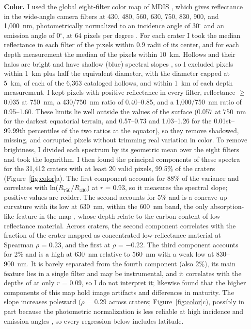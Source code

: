 \documentclass{planetary}
\begin{document}
\textbf{Color.} \label{sec:colorS} I used the global eight-filter color map of MDIS \parencite{mdis_mdr,murchie2015}, which gives reflectance in the wide-angle camera filters at 430, 480, 560, 630, 750, 830, 900, and 1,000~nm, photometrically normalized to an incidence angle of 30$^\circ$ and an emission angle of 0$^\circ$, at 64 pixels per degree \parencite{denevi2018}. For each crater I took the median reflectance in each filter of the pixels within 0.9 radii of its center, and for each depth measurement the median of the pixels within 10~km. Hollows and their halos are bright and have shallow (blue) spectral slopes \parencite{blewettMultispectralImagesMercury2009}, so I excluded pixels within 1~km plus half the equivalent diameter, with the diameter capped at 5~km, of each of the 6,363 cataloged hollows, and within 1~km of each depth measurement. I kept pixels with positive reflectance in every filter, reflectance $\geq$ 0.035 at 750~nm, a 430/750~nm ratio of 0.40--0.85, and a 1,000/750~nm ratio of 0.95--1.60. These limits lie well outside the values of the surface (0.057 at 750~nm for the darkest equatorial terrain, and 0.57--0.73 and 1.03--1.26 for the 0.01st--99.99th percentiles of the two ratios at the equator), so they remove shadowed, missing, and corrupted pixels without trimming real variation in color. To remove brightness, I divided each spectrum by its geometric mean over the eight filters and took the logarithm. I then found the principal components of these spectra for the 31,412 craters with at least 20 valid pixels, 99.5\% of the craters (Figure~\ref{fig:color}a). The first component accounts for 88\% of the variance and correlates with ln($R_{750}/R_{430}$) at $r$ = 0.93, so it measures the spectral slope; positive values are redder. The second accounts for 5\% and is a concave-up curvature with its low at 630~nm, within the 600~nm band, the only absorption-like feature in the map \parencite{murchie2015}, whose depth \textcite{klima2018} relate to the carbon content of low-reflectance material. Across craters, the second component correlates with the fraction of the crater mapped as concentrated low-reflectance material at Spearman $\rho$ = 0.23, and the first at $\rho$ = $-$0.22. The third component accounts for 2\% and is a high at 630~nm relative to 560~nm with a weak low at 830--900~nm. It is barely separated from the fourth component (also 2\%), its main feature lies in a single filter and may be instrumental, and it correlates with the depths of \textcite{blewett2016} at only $r$ = 0.09, so I do not interpret it; \textcite{murchie2015} likewise found that the higher components of this map hold image artifacts and differences in maturity. The slope increases poleward ($\rho$ = 0.29 across craters; Figure~\ref{fig:color}c), possibly in part because the photometric normalization is less reliable at high incidence and emission angles \parencite{domingueMercurysGlobalColor2015,murchie2015}, so every regression below includes latitude.
\end{document}
